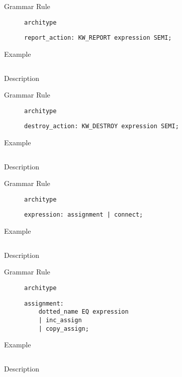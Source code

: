 \begin{description}
    \item[Grammar Rule] \texttt{architype}
          \begin{lstlisting}[style=gram]
report_action: KW_REPORT expression SEMI;
        \end{lstlisting}
    \item[Example] \texttt{}
          \begin{lstlisting}
        \end{lstlisting}

    \item[Description]
\end{description}


\begin{description}
    \item[Grammar Rule] \texttt{architype}
          \begin{lstlisting}[style=gram]
destroy_action: KW_DESTROY expression SEMI;
        \end{lstlisting}
    \item[Example] \texttt{}
          \begin{lstlisting}
        \end{lstlisting}

    \item[Description]
\end{description}


\begin{description}
    \item[Grammar Rule] \texttt{architype}
          \begin{lstlisting}[style=gram]
expression: assignment | connect;
        \end{lstlisting}
    \item[Example] \texttt{}
          \begin{lstlisting}
        \end{lstlisting}

    \item[Description]
\end{description}


\begin{description}
    \item[Grammar Rule] \texttt{architype}
          \begin{lstlisting}[style=gram]
assignment:
    dotted_name EQ expression
    | inc_assign
    | copy_assign;
        \end{lstlisting}
    \item[Example] \texttt{}
          \begin{lstlisting}
        \end{lstlisting}

    \item[Description]
\end{description}

